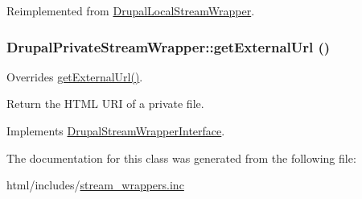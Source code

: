Reimplemented from \hyperlink{classDrupalLocalStreamWrapper_a3ff87a4643479303f4880f2381d0f432}{DrupalLocalStreamWrapper}.\hypertarget{classDrupalPrivateStreamWrapper_a1c1ee83f635dd12b6e806f1d1b1d1de3}{
\subsubsection[{getExternalUrl}]{\setlength{\rightskip}{0pt plus 5cm}DrupalPrivateStreamWrapper::getExternalUrl ()}}
\label{classDrupalPrivateStreamWrapper_a1c1ee83f635dd12b6e806f1d1b1d1de3}
Overrides \hyperlink{classDrupalPrivateStreamWrapper_a1c1ee83f635dd12b6e806f1d1b1d1de3}{getExternalUrl()}.

Return the HTML URI of a private file. 

Implements \hyperlink{interfaceDrupalStreamWrapperInterface_af8474357b8c79f1a7629084a05541d16}{DrupalStreamWrapperInterface}.

The documentation for this class was generated from the following file:\begin{DoxyCompactItemize}
\item 
html/includes/\hyperlink{stream__wrappers_8inc}{stream\_\-wrappers.inc}\end{DoxyCompactItemize}
